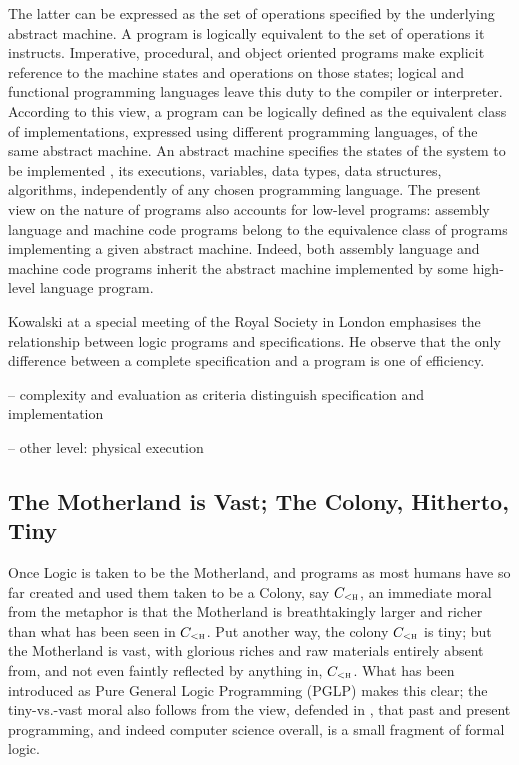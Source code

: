 \documentclass[]{article}
\begin{document}
The latter can be expressed as the set of operations specified by the underlying abstract machine. A program is logically equivalent to the set of
operations it instructs. Imperative, procedural, and object oriented programs make explicit reference to the machine states and operations on those states; logical and functional programming languages leave this duty to the compiler or interpreter.  According to this view, a program can be logically defined as the equivalent class of implementations, expressed using different programming languages, of the same abstract machine. An abstract machine specifies the states of the system to be  implemented , its executions, variables, data types, data structures, algorithms, independently of any chosen programming language. The present view on the nature of programs also accounts for low-level programs: assembly language and machine code programs belong to the equivalence class of programs implementing a given abstract machine. Indeed, both assembly language and machine code programs inherit the abstract machine implemented by some high-level language program.


{\color{red}{(Selmer:) A good program P from the pov of a rational mind M is one that M has rigorous reason to believe will behave correctly upon execution. Without logic, “rigorous reason” cannot be meaningfully explicated. Therefore, all good program require logic. (Note that “logic” includes “inductive logic.”) }}

{\color{red}{Ray (links down to Magna Carta)}}


Kowalski at a special meeting of the Royal Society in London emphasises
the relationship between logic programs and specifications. He observe that
the only difference between a complete specification and a program is one of
efficiency.


-- complexity and evaluation as criteria distinguish specification and implementation

-- other level: physical execution


\subsection{The Motherland is Vast; The Colony, Hitherto, Tiny}
\label{sect:motherlandvast_colonytiny}

\noindent
%
Once Logic is taken to be the Motherland, and programs as most humans
have so far created and used them taken to be a Colony, say
$C_\textsc{<h}$, an immediate moral from the metaphor is that the
Motherland is breathtakingly larger and richer than what has been seen
in $C_\textsc{<h}$.  Put another way, the colony $C_\textsc{<h}$ is
tiny; but the Motherland is vast, with glorious riches and raw
materials entirely absent from, and not even faintly reflected by
anything in, $C_\textsc{<h}$.  What has been introduced as Pure
General Logic Programming (PGLP) \cite{introduction_of_PGLP} makes
this clear; the tiny-vs.-vast moral also follows from the view,
defended in \cite{comp_sci_immaterial_formal_logic}, that past and
present programming, and indeed computer science overall, is a small
fragment of formal logic.
\end{document}
